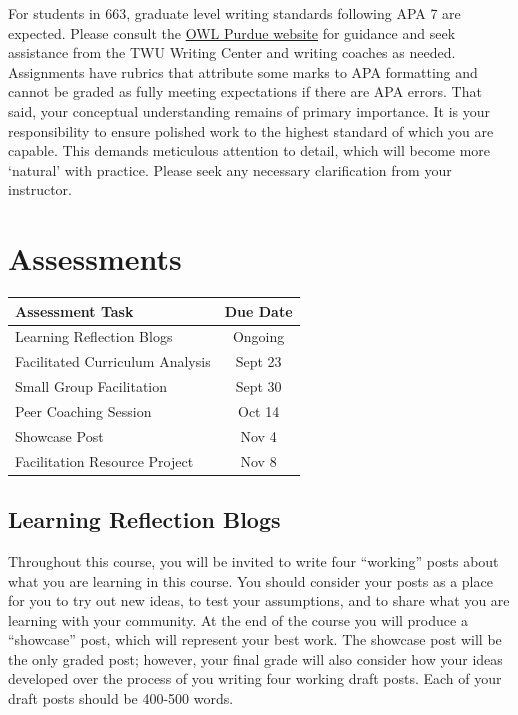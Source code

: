 \documentclass[
]{book}
\begin{document}
For students in 663, graduate level writing standards following APA 7 are expected. Please consult the \href{https://owl.purdue.edu/owl/research_and_citation/apa_style/apa_style_introduction.html}{OWL Purdue website} for guidance and seek assistance from the TWU Writing Center and writing coaches as needed. Assignments have rubrics that attribute some marks to APA formatting and cannot be graded as fully meeting expectations if there are APA errors. That said, your conceptual understanding remains of primary importance. It is your responsibility to ensure polished work to the highest standard of which you are capable. This demands meticulous attention to detail, which will become more `natural' with practice. Please seek any necessary clarification from your instructor.

\hypertarget{assessments}{%
\chapter*{Assessments}\label{assessments}}

\begin{longtable}[]{@{}lc@{}}
\toprule\noalign{}
Assessment Task & Due Date \\
\midrule\noalign{}
\endhead
\bottomrule\noalign{}
\endlastfoot
Learning Reflection Blogs & Ongoing \\
Facilitated Curriculum Analysis & Sept 23 \\
Small Group Facilitation & Sept 30 \\
Peer Coaching Session & Oct 14 \\
Showcase Post & Nov 4 \\
Facilitation Resource Project & Nov 8 \\
\end{longtable}

\hypertarget{learning-reflection-blogs}{%
\section*{Learning Reflection Blogs}\label{learning-reflection-blogs}}

Throughout this course, you will be invited to write four ``working'' posts about what you are learning in this course. You should consider your posts as a place for you to try out new ideas, to test your assumptions, and to share what you are learning with your community. At the end of the course you will produce a ``showcase'' post, which will represent your best work. The showcase post will be the only graded post; however, your final grade will also consider how your ideas developed over the process of you writing four working draft posts.
Each of your draft posts should be 400-500 words.
\end{document}
